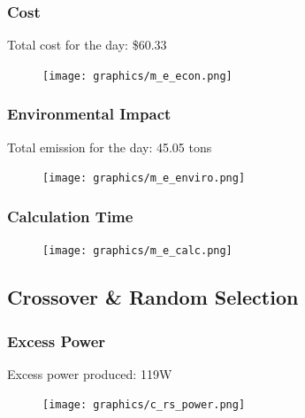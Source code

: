 \documentclass{article}
\begin{document}
        \subsubsection{Cost}
        Total cost for the day: \$60.33
            \begin{figure}[h!]
                \begin{center}
                    \texttt{[image: graphics/m\_e\_econ.png]}
                \end{center}
                \label{fig:MEcost}
            \end{figure}
        \newpage    
        \subsubsection{Environmental Impact}
        Total emission for the day: 45.05 tons
            \begin{figure}[h!]
                \begin{center}
                    \texttt{[image: graphics/m\_e\_enviro.png]}
                \end{center}                
                \label{fig:MEemissions}
            \end{figure}
        
        \subsubsection{Calculation Time}
            \begin{figure}[h!]
                \begin{center}
                    \texttt{[image: graphics/m\_e\_calc.png]}
                \end{center}                
                \label{fig:MEcalc}
            \end{figure}
    \newpage    
    \subsection{Crossover \& Random Selection}
        \subsubsection{Excess Power}
            Excess power produced: 119W
            \begin{figure}[h!]
                \begin{center}
                    \texttt{[image: graphics/c\_rs\_power.png]}
                \end{center}                
                \label{fig:CRSpower}
            \end{figure}        
\end{document}
